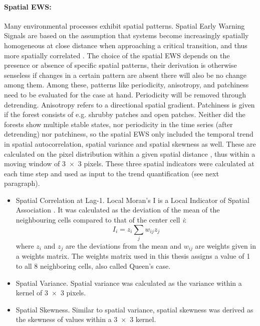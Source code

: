 \paragraph{Spatial EWS:}
Many environmental processes exhibit spatial patterns. Spatial Early Warning Signals are based on the assumption that systems become increasingly spatially homogeneous at close distance when approaching a critical transition, and thus more spatially correlated \citep{kefi2014}. The choice of the spatial EWS depends on the presence or absence of specific spatial patterns, their derivation is otherwise senseless if changes in a certain pattern are absent there will also be no change among them. Among these, patterns like periodicity, anisotropy, and patchiness need to be evaluated for the case at hand. Periodicity will be removed through detrending. Anisotropy refers to a directional spatial gradient. Patchiness is given if the forest consists of e.g. shrubby patches and open patches. Neither did the forests show multiple stable states, nor periodicity in the time series (after detrending) nor patchiness, so the spatial EWS only included the temporal trend in spatial autocorrelation, spatial variance and spatial skewness as well. These are calculated on the pixel distribution within a given spatial distance \citep{kefi2014}, thus within a moving window of 3~$\times$~3 pixels. These three spatial indicators were calculated at each time step and used as input to the trend quantification (see next paragraph).\\
\begin{itemize}
	\item Spatial Correlation at Lag-1. Local Moran's I is a Local Indicator of Spatial Association \citep[LISA,][]{anselin1995}. It was calculated as the deviation of the mean of the neighbouring cells compared to that of the center cell \textit{i}:
	\begin{equation}
		I_i = z_i \sum_j w_{ij}z_j
	\end{equation}
	where $z_i$ and $z_j$ are the deviations from the mean and $w_{ij}$ are weights given in a weights matrix. The weights matrix used in this thesis assigns a value of 1 to all 8 neighboring cells, also called Queen's case.
	\item Spatial Variance. Spatial variance was calculated as the variance within a kernel of 3~$\times$~3 pixels.
	\item Spatial Skewness. Similar to spatial variance, spatial skewness was derived as the skewness of values within a 3~$\times$~3 kernel.
\end{itemize}




